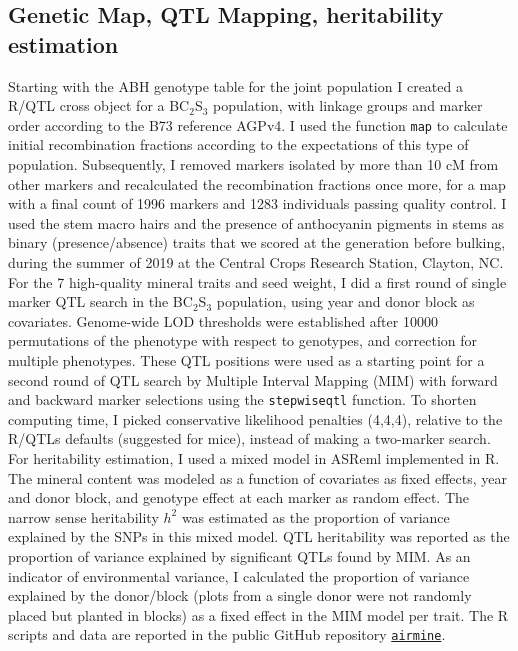 \subsection{Genetic Map, QTL Mapping, heritability estimation}
Starting with the ABH genotype table for the joint population I created a R/QTL \citep{broman2012} cross object for a BC$_2$S$_3$ population, with linkage groups and marker order according to the B73 reference AGPv4. I used the function \texttt{map} to calculate initial recombination fractions according to the expectations of this type of population. 
Subsequently, I removed markers isolated by more than 10 cM from other markers and recalculated the recombination fractions once more, for a map with a final count of 1996 markers and 1283 individuals passing quality control. 
I used the stem macro hairs and the presence of anthocyanin pigments in stems as binary (presence/absence) traits that we scored at the generation before bulking, during the summer of 2019 at the Central Crops Research Station, Clayton, NC.
For the 7 high-quality mineral traits and seed weight, I did a first round of single marker QTL search in the BC$_2$S$_3$ population, using year and donor block as covariates. 
Genome-wide LOD thresholds were established after 10000 permutations of the phenotype with respect to genotypes, and correction for multiple phenotypes.
These QTL positions were used as a starting point for a second round of QTL search by Multiple Interval Mapping (MIM) with forward and backward marker selections using the \texttt{stepwiseqtl} function. 
To shorten computing time, I picked conservative likelihood penalties (4,4,4),  relative to the R/QTLs defaults (suggested for mice), instead of making a two-marker search.  
For heritability estimation, I used a mixed model in ASReml implemented in R.
The mineral content was modeled as a function of covariates as fixed effects, year and donor block, and genotype effect at each marker as random effect.
The narrow sense heritability $h^2$ was estimated as the proportion of variance explained by the SNPs in this mixed model. 
QTL heritability was reported as the proportion of variance explained by significant QTLs found by MIM.
As an indicator of environmental variance, I calculated the proportion of variance explained by the donor/block (plots from a single donor were not randomly placed but planted in blocks) as a fixed effect in the MIM model per trait.
The R scripts and data are reported in the public GitHub repository  \href{https://github.com/sawers-rellan-labs/airmine}{\texttt{airmine}}.
\clearpage

